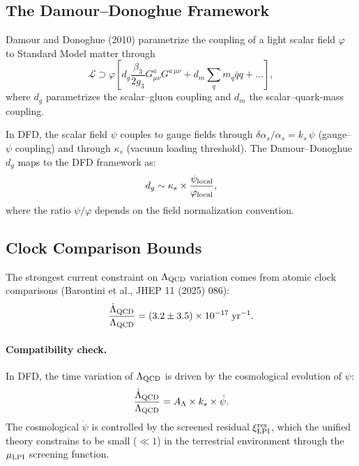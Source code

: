 \documentclass[11pt,letterpaper]{article}
\theoremstyle{definition}
\begin{document}
\subsection{The Damour--Donoghue Framework}

Damour and Donoghue (2010) parametrize the coupling of a light
scalar field $\varphi$ to Standard Model matter through
\begin{equation}
\mathcal{L} \supset \varphi \left[
d_g \frac{\beta_3}{2g_3} G_{\mu\nu}^a G^{a\,\mu\nu}
+ d_m \sum_q m_q \bar{q}q + \ldots \right],
\end{equation}
where $d_g$ parametrizes the scalar--gluon coupling and $d_m$ the
scalar--quark-mass coupling.

In DFD, the scalar field $\psi$ couples to gauge fields through
$\delta\alpha_s/\alpha_s = k_s\,\psi$ (gauge--$\psi$ coupling)
and through $\kappa_s$ (vacuum loading threshold).  The
Damour--Donoghue $d_g$ maps to the DFD framework as:
\begin{equation}\label{eq:dg-mapping}
d_g \sim \kappa_s \times \frac{\psi_{\rm local}}{\varphi_{\rm local}},
\end{equation}
where the ratio $\psi/\varphi$ depends on the field normalization
convention.

\subsection{Clock Comparison Bounds}

The strongest current constraint on $\Lambda_{\rm QCD}$ variation
comes from atomic clock comparisons (Barontini et al., JHEP 11
(2025) 086):
\begin{equation}
\frac{\dot{\Lambda}_{\rm QCD}}{\Lambda_{\rm QCD}}
= (3.2 \pm 3.5) \times 10^{-17}\;\mathrm{yr}^{-1}.
\end{equation}

\paragraph{Compatibility check.}
In DFD, the time variation of $\Lambda_{\rm QCD}$ is driven by the
cosmological evolution of $\psi$:
\begin{equation}
\frac{\dot{\Lambda}_{\rm QCD}}{\Lambda_{\rm QCD}}
= A_\Lambda \times k_s \times \dot{\psi}.
\end{equation}
The cosmological $\dot{\psi}$ is controlled by the screened residual
$\xi_{\rm LPI}^{\rm res}$, which the unified theory constrains to be
small ($\ll 1$) in the terrestrial environment through the
$\mu_{\rm LPI}$ screening function.
\end{document}
